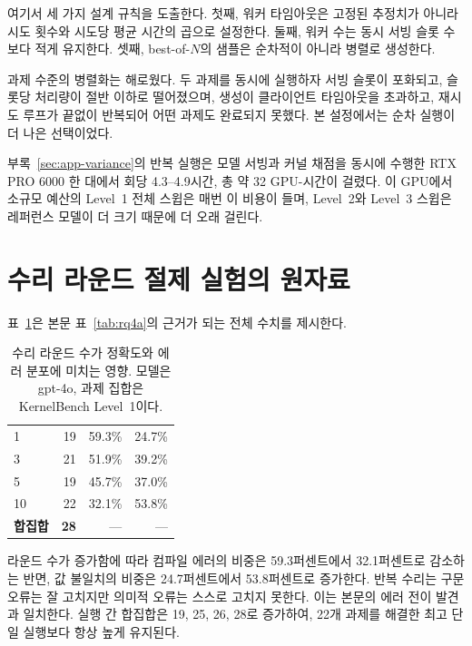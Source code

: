 여기서 세 가지 설계 규칙을 도출한다. 첫째, 워커 타임아웃은 고정된 추정치가 아니라 시도 횟수와
시도당 평균 시간의 곱으로 설정한다. 둘째, 워커 수는 동시 서빙 슬롯 수보다 적게 유지한다. 셋째,
best-of-$N$의 샘플은 순차적이 아니라 병렬로 생성한다.

과제 수준의 병렬화는 해로웠다. 두 과제를 동시에 실행하자 서빙 슬롯이 포화되고, 슬롯당 처리량이
절반 이하로 떨어졌으며, 생성이 클라이언트 타임아웃을 초과하고, 재시도 루프가 끝없이 반복되어
어떤 과제도 완료되지 못했다. 본 설정에서는 순차 실행이 더 나은 선택이었다.

부록~\ref{sec:app-variance}의 반복 실행은 모델 서빙과 커널 채점을 동시에 수행한 RTX PRO 6000
한 대에서 회당 4.3--4.9시간, 총 약 32 GPU-시간이 걸렸다. 이 GPU에서 소규모 예산의 Level~1 전체
스윕은 매번 이 비용이 들며, Level~2와 Level~3 스윕은 레퍼런스 모델이 더 크기 때문에 더 오래 걸린다.

\section{수리 라운드 절제 실험의 원자료}

표~\ref{tab:ablation}은 본문 표~\ref{tab:rq4a}의 근거가 되는 전체 수치를 제시한다.

\begin{table}[h]
\centering
\small
\setlength{\tabcolsep}{5pt}
\caption{수리 라운드 수가 정확도와 에러 분포에 미치는 영향.
모델은 gpt-4o, 과제 집합은 KernelBench Level~1이다.}
\label{tab:ablation}
\begin{tabular}{@{}lrrr@{}}
\toprule
\headrow{라운드} & \headrow{해결 (/100)} & \headrow{컴파일 에러} & \headrow{값 불일치} \\
\midrule
1  & 19 & 59.3\% & 24.7\% \\
3  & 21 & 51.9\% & 39.2\% \\
5  & 19 & 45.7\% & 37.0\% \\
10 & 22 & 32.1\% & 53.8\% \\
\midrule
\textbf{합집합} & \textbf{28} & --- & --- \\
\bottomrule
\end{tabular}
\end{table}

라운드 수가 증가함에 따라 컴파일 에러의 비중은 59.3퍼센트에서 32.1퍼센트로 감소하는 반면,
값 불일치의 비중은 24.7퍼센트에서 53.8퍼센트로 증가한다. 반복 수리는 구문 오류는 잘 고치지만
의미적 오류는 스스로 고치지 못한다. 이는 본문의 에러 전이 발견과 일치한다. 실행 간 합집합은
19, 25, 26, 28로 증가하여, 22개 과제를 해결한 최고 단일 실행보다 항상 높게 유지된다.

